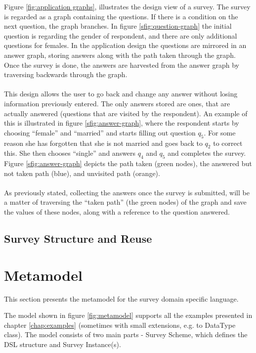 Figure \ref{fig:application graphs}, illustrates the design view of a survey. The survey is regarded as a graph containing the questions. If there is a condition on the next question, the graph branches. In figure \ref{sfig:question-graph} the initial question is regarding the gender of respondent, and there are only additional questions for females. In the application design the questions are mirrored in an answer graph, storing answers along with the path taken through the graph. Once the survey is done, the answers are harvested from the answer graph by traversing backwards through the graph. \\\\
This design allows the user to go back and change any answer without losing information previously entered. The only answers stored are ones, that are actually answered (questions that are visited by the respondent). An example of this is illustrated in figure \ref{sfig:answer-graph}, where the respondent starts by choosing ``female'' and ``married'' and starts filling out question $q_5$. For some reason she has forgotten that she is not married and goes back to $q_2$ to correct this. She then chooses ``single'' and answers $q_4$ and $q_5$ and completes the survey. Figure \ref{sfig:answer-graph} depicts the path taken (green nodes), the answered but not taken path (blue), and unvisited path (orange).\\\\
As previously stated, collecting the answers once the survey is submitted, will be a matter of traversing the ``taken path'' (the green nodes) of the graph and save the values of these nodes, along with a reference to the question answered.

\subsection{Survey Structure and Reuse}
\label{subsec:modularityandreuse}


\section{Metamodel}
\label{sec:metamodel}
This section presents the metamodel for the survey domain specific language.  

The model shown in figure \ref{fig:metamodel} supports all the examples presented in chapter \ref{chap:examples} (sometimes with small extensions, e.g. to DataType class).
The model consists of two main parts - Survey Scheme, which defines the DSL structure and Survey Instance(s).

